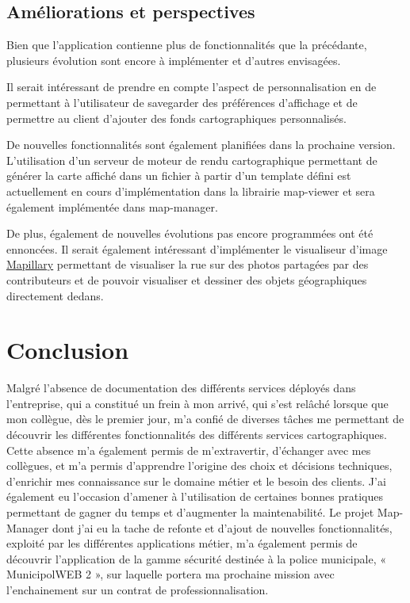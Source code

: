 \documentclass{rapportUHA40}
\begin{document}
\subsection{Améliorations et perspectives}
Bien que l'application contienne plus de fonctionnalités que la précédante,
plusieurs évolution sont encore à implémenter et d'autres envisagées.

Il serait intéressant de prendre en compte l'aspect de personnalisation en de
permettant à l'utilisateur de savegarder des préférences d'affichage et de
permettre au client d'ajouter des fonds cartographiques personnalisés.

De nouvelles fonctionnalités sont également planifiées dans la prochaine
version. L'utilisation d'un serveur de moteur de rendu cartographique
permettant de générer la carte affiché dans un fichier à partir d'un template
défini est actuellement en cours d'implémentation dans la librairie map-viewer
et sera également implémentée dans map-manager.

De plus, également de nouvelles évolutions pas encore programmées ont été
ennoncées. Il serait également intéressant d'implémenter le visualiseur d'image
\href{https://www.mapillary.com/app/}{Mapillary} permettant de visualiser la
rue sur des photos partagées par des contributeurs et de pouvoir visualiser et
dessiner des objets géographiques directement dedans.


\newpage
\section*{Conclusion}

Malgré l'absence de documentation des différents services déployés dans
l'entreprise, qui a constitué un frein à mon arrivé, qui s’est relâché lorsque
que mon collègue, dès le premier jour, m’a confié de diverses tâches me
permettant de découvrir les différentes fonctionnalités des différents services
cartographiques. Cette absence m’a également permis de m’extravertir,
d’échanger avec mes collègues, et m’a permis d’apprendre l’origine des choix et
décisions techniques, d’enrichir mes connaissance sur le domaine métier et le
besoin des clients. J’ai également eu l’occasion d’amener à l’utilisation de
certaines bonnes pratiques permettant de gagner du temps et d’augmenter la
maintenabilité. Le projet Map-Manager dont j'ai eu la tache de refonte et
d'ajout de nouvelles fonctionnalités, exploité par les différentes applications
métier, m’a également permis de découvrir l’application de la gamme sécurité
destinée à la police municipale, « MunicipolWEB 2 », sur laquelle portera ma
prochaine mission avec l’enchainement sur un contrat de professionnalisation.
\end{document}
